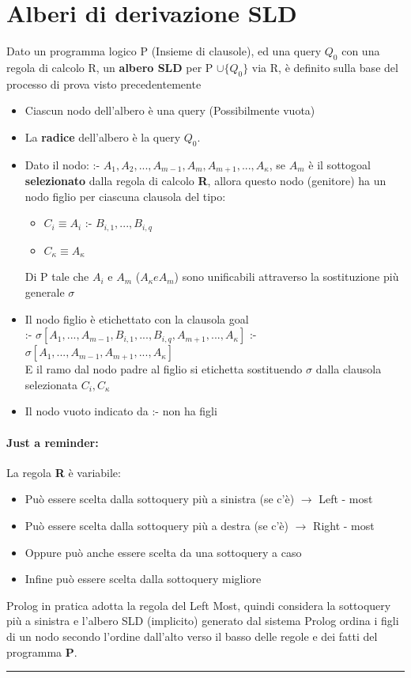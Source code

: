 \documentclass[12pt, a4paper, openany, oneside]{book}
\begin{document}
\section{Alberi di derivazione SLD}
Dato un programma logico P (Insieme di clausole), ed una query $Q_{0}$ con una 
regola di calcolo R, un \textbf{albero SLD} per P $\cup \{Q_{0}\}$ via R, è 
definito sulla base del processo di prova visto precedentemente
\begin{itemize}
	\item Ciascun nodo dell'albero è una query (Possibilmente vuota)
	\item La \textbf{radice} dell'albero è la query $Q_{0}$.
	\item Dato il nodo: :- $A_{1}, A_{2}, ..., A_{m-1}, A_{m}, A_{m+1}, ...,
	A_{\kappa}$, se $A_{m}$ è il sottogoal \textbf{selezionato} dalla regola di
	calcolo \textbf{R}, allora questo nodo (genitore) ha un nodo figlio per 
	ciascuna clausola del tipo: \\
	\begin{itemize}
		\item $C_{i} \equiv A_{i}$ :- $B_{i,1}, ..., B_{i,q}$
		\item $C_{\kappa} \equiv A_{\kappa}$
	\end{itemize}
	Di P tale che $A_{i}$ e $A_{m}$ ($A_{\kappa} e A_{m}$) sono unificabili 
	attraverso la sostituzione più generale $\sigma$
	\item Il nodo figlio è etichettato con la clausola goal \\
	:- $\sigma[A_{1}, ..., A_{m-1}, B_{i,1}, ..., B_{i,q}, A_{m+1}, ..., A_{\kappa}]$
	:- $\sigma[A_{1}, ..., A_{m-1}, A_{m+1}, ..., A_{\kappa}]$ \\
	E il ramo dal nodo padre al figlio si etichetta sostituendo $\sigma$ dalla
	clausola selezionata $C_{i}, C_{\kappa}$
	\item Il nodo vuoto indicato da :- non ha figli
\end{itemize}
\paragraph{Just a reminder: }La regola \textbf{R} è variabile:
\begin{itemize}
	\item Può essere scelta dalla sottoquery più a sinistra (se c'è) $\to$ Left - most
	\item Può essere scelta dalla sottoquery più a destra (se c'è) $\to$ Right - most
	\item Oppure può anche essere scelta da una sottoquery a caso
	\item Infine può essere scelta dalla sottoquery migliore
\end{itemize}
Prolog in pratica adotta la regola del Left Most, quindi considera la sottoquery
più a sinistra e l'albero SLD (implicito) generato dal sistema Prolog ordina i 
figli di un nodo secondo l'ordine dall'alto verso il basso delle regole e dei 
fatti del programma \textbf{P}.
\\
{\color{black} \rule{\linewidth}{0.3mm} }
\\
\end{document}

